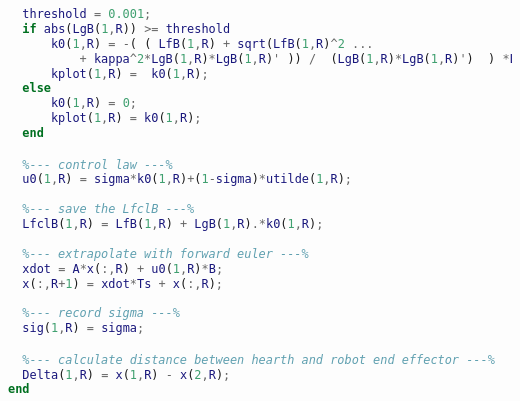 \begin{lstlisting}[language=matlab]
  %--- Find safe controller ---%
  threshold = 0.001;
  if abs(LgB(1,R)) >= threshold
      k0(1,R) = -( ( LfB(1,R) + sqrt(LfB(1,R)^2 ...
          + kappa^2*LgB(1,R)*LgB(1,R)' )) /  (LgB(1,R)*LgB(1,R)')  ) *LgB(1,R);
      kplot(1,R) =  k0(1,R);
  else
      k0(1,R) = 0;
      kplot(1,R) = k0(1,R);
  end 

  %--- control law ---%
  u0(1,R) = sigma*k0(1,R)+(1-sigma)*utilde(1,R);
  
  %--- save the LfclB ---%  
  LfclB(1,R) = LfB(1,R) + LgB(1,R).*k0(1,R);
  
  %--- extrapolate with forward euler ---%
  xdot = A*x(:,R) + u0(1,R)*B;
  x(:,R+1) = xdot*Ts + x(:,R);
  
  %--- record sigma ---%
  sig(1,R) = sigma;

  %--- calculate distance between hearth and robot end effector ---%
  Delta(1,R) = x(1,R) - x(2,R);
end
\end{lstlisting}